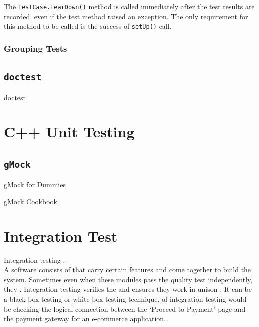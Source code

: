 The \texttt{TestCase.tearDown()} method is called immediately after 
the test results are recorded, even if the test method raised an exception. 
The only requirement for this method to be called is the success of \texttt{setUp()} call.

\subsubsection{Grouping Tests}

\subsection{\texttt{doctest}}
\href{https://docs.python.org/3/library/doctest.html#module-doctest}{doctest}


\section{C++ Unit Testing}
\subsection{\texttt{gMock}}
\href{http://google.github.io/googletest/gmock_for_dummies.html}{gMock for Dummies}

\href{http://google.github.io/googletest/gmock_cook_book.html}{gMock Cookbook}

\section{Integration Test}
Integration testing 
\newline 
{}. \\
A software consists of  that carry certain features 
and come together to build the system. 
Sometimes even when these modules pass the quality test independently, 
they . 
\newline
Integration testing verifies the  and ensures they work in unison . 
It can be a black-box testing or white-box testing technique.
\newline
{} of integration testing would be checking the logical connection 
between the ‘Proceed to Payment’ page and the payment gateway for an 
e-commerce application.

